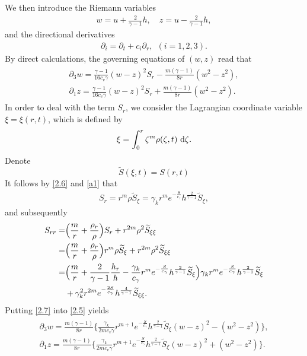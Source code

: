 \documentclass[11pt,reqno]{article}
\newcommand{\fr}{\frac}
\newcommand{\pa}{\partial}
\numberwithin{equation}{section}
\begin{document}
We then introduce the Riemann variables
\begin{align}\label{2.3}
w=u+\frac{2}{\gamma-1}h,\quad z=u-\frac{2}{\gamma-1}h,
\end{align}
and the directional derivatives
\begin{align}\label{2.4}
\pa_i=\pa_t+c_i\pa_r,\ \ (i=1,2,3).
\end{align}
By direct calculations, the governing equations of $(w,z)$ read that
\begin{align}\label{2.5}
\begin{split}
\pa_3w=\frac{\gamma-1}{16c_v\gamma}(w-z)^2S_r - \frac{m(\gamma-1)}{8r}(w^2-z^2), \\
\pa_1z=\frac{\gamma-1}{16c_v\gamma}(w-z)^2S_r + \frac{m(\gamma-1)}{8r}(w^2-z^2).
\end{split}
\end{align}
In order to deal with the term $S_r$, we consider the Lagrangian coordinate variable $\xi=\xi(r,t)$, which is defined by
\begin{align}\label{2.6}
\xi=\int_{0}^r\zeta^m\rho(\zeta,t)\ {\rm d}\zeta.
\end{align}
Denote
\begin{equation}
\label{st}
\widetilde{S}(\xi,t)=S(r,t)
\end{equation}
It follows by \eqref{2.6} and \eqref{a1} that
\begin{align}\label{2.7}
S_r=r^m\rho \widetilde{S}_\xi =\gamma_k r^m e^{-\fr{S}{c_\gamma}}h^{\fr{2}{\gamma-1}}\widetilde{S}_\xi,
\end{align}
and subsequently
\begin{align}\label{2.8}
S_{rr}=&\Big(\fr{m}{r}+\fr{\rho_r}{\rho}\Big)S_r+r^{2m}\rho^2 \widetilde{S}_{\xi\xi} \notag \\
=&\Big(\fr{m}{r}+\fr{\rho_r}{\rho}\Big)r^m\rho \widetilde{S}_\xi+r^{2m}\rho^2 \widetilde{S}_{\xi\xi} \notag \\
=& \Big(\fr{m}{r}+\fr{2}{\gamma-1}\fr{h_r}{h}-\fr{\gamma_k}{c_\gamma}r^{m}  e^{-\fr{S}{c_\gamma}}h^{\fr{2}{\gamma-1}}\widetilde{S}_\xi\Big)\gamma_k r^m e^{-\fr{S}{c_\gamma}}h^{\fr{2}{\gamma-1}}\widetilde{S}_\xi \notag \\
&+\gamma_{k}^2r^{2m}e^{-\fr{2S}{c_\gamma}}h^{\fr{4}{\gamma-1}} \widetilde{S}_{\xi\xi}.
\end{align}
Putting \eqref{2.7} into \eqref{2.5} yields
\begin{align}\label{2.9}
\begin{split}
\pa_3w=\frac{m(\gamma-1)}{8r} \bigg\{\frac{\gamma_k}{2m c_v\gamma}r^{m+1}e^{-\fr{S}{c_\gamma}}h^{\fr{2}{\gamma-1}}\widetilde{S}_\xi(w-z)^2 - (w^2-z^2)\bigg\}, \\
\pa_1z=\frac{m(\gamma-1)}{8r} \bigg\{\frac{\gamma_k}{2m c_v\gamma}r^{m+1}e^{-\fr{S}{c_\gamma}}h^{\fr{2}{\gamma-1}}\widetilde{S}_\xi(w-z)^2 + (w^2-z^2)\bigg\}.
\end{split}
\end{align}
\end{document}
